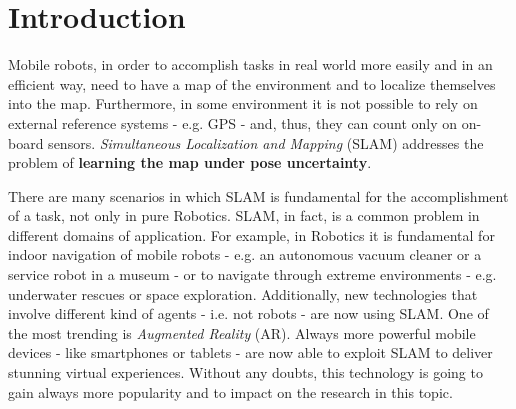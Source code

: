 \chapter{Introduction}\label{ch:intro}
Mobile robots, in order to accomplish tasks in real world more easily and in an efficient way, need to have a map of the environment and to localize themselves into the map. Furthermore, in some environment it is not possible to rely on external reference systems - e.g. GPS - and, thus, they can count only on on-board sensors. \textit{Simultaneous Localization and Mapping} (SLAM) addresses the problem of \textbf{learning the map under pose uncertainty}.

There are many scenarios in which SLAM is fundamental for the accomplishment of a task, not only in pure Robotics. SLAM, in fact, is a common problem in different domains of application. For example, in Robotics it is fundamental for indoor navigation of mobile robots - e.g. an autonomous vacuum cleaner or a service robot in a museum - or to navigate through extreme environments - e.g. underwater rescues or space exploration. Additionally, new technologies that involve different kind of agents - i.e. not robots - are now using SLAM. One of the most trending is \textit{Augmented Reality} (AR). Always more powerful mobile devices - like smartphones or tablets - are now able to exploit SLAM to deliver stunning virtual experiences. Without any doubts, this technology is going to gain always more popularity and to impact on the research in this topic.
\vspace{5px}

